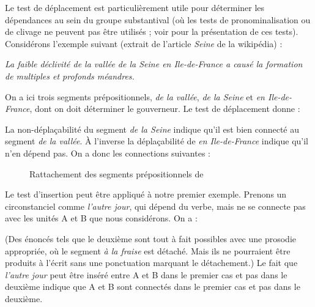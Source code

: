 Le test de déplacement est particulièrement utile pour déterminer les dépendances au sein du groupe substantival (où les tests de pronominalisation ou de clivage ne peuvent pas être utilisés ; voir  pour la présentation de ces tests). Considérons l’exemple suivant (extrait de l’article \textit{Seine} de la wikipédia) :

\ea \textit{La faible déclivité de la vallée de la Seine en Ile-de-France a causé la formation de multiples et profonds méandres.}
\label{ex:Seine}\z

On a ici trois segments prépositionnels, \textit{de la vallée}, \textit{de la Seine} et \textit{en Ile-de-France}, dont on doit déterminer le gouverneur. Le test de déplacement donne :

\ea
  \z
\z
La non-déplaçabilité du segment \textit{de la Seine} indique qu’il est bien connecté au segment \textit{de la vallée}. À l’inverse la déplaçabilité de \textit{en Ile-de-France} indique qu’il n’en dépend pas. On a donc les connections suivantes :

\begin{figure}
\small{}
\caption{\label{fig:}Rattachement des segments prépositionnels de }
\end{figure}

Le test d’insertion peut être appliqué à notre premier exemple. Prenons un circonstanciel comme \textit{l’autre jour}, qui dépend du verbe, mais ne se connecte pas avec les unités A et B que nous considérons. On a :

\ea
  \z
\z
(Des énoncés tels que le deuxième sont tout à fait possibles avec une prosodie appropriée, où le segment \textit{à la fraise} est détaché. Mais ils ne pourraient être produits à l’écrit sans une ponctuation marquant le détachement.) Le fait que \textit{l’autre jour} peut être inséré entre A et B dans le premier cas et pas dans le deuxième indique que A et B sont connectés dans le premier cas et pas dans le deuxième.

